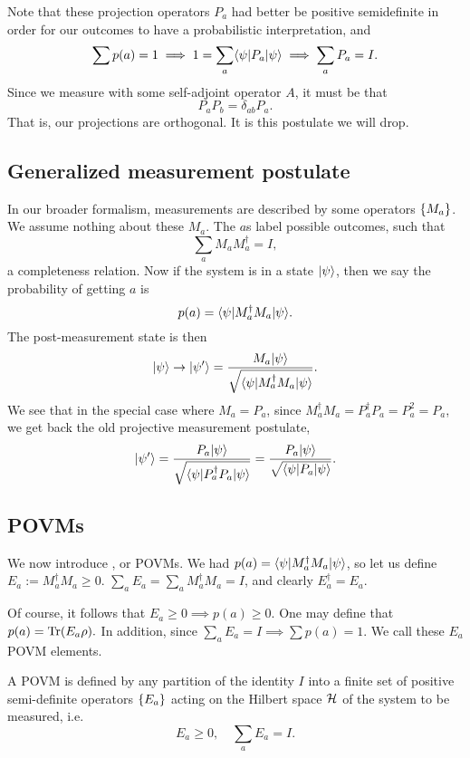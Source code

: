 Note that these projection operators $P_a$ had better be positive semidefinite in order for our outcomes to have a probabilistic interpretation, and 
\begin{equation}
    \sum p(a)=1 \implies 1 = \sum_a \langle\psi\rvert P_a \lvert\psi\rangle \implies \sum_a P_a = I.
\end{equation}
Since we measure with some self-adjoint operator $A$, it must be that
\begin{equation}
    P_a P_b = \delta_{ab} P_a.
\end{equation}
That is, our projections are orthogonal. It is this postulate we will drop.
\subsection*{Generalized measurement postulate}
In our broader formalism, measurements are described by some operators $\{M_a\}$. We assume nothing about these $M_a$. The $a$s label possible outcomes, such that
\begin{equation}
    \sum_a M_a M^\dagger_a = I,
\end{equation}
a completeness relation. Now if the system is in a state $\lvert\psi\rangle$, then we say the probability of getting $a$ is
\begin{equation}
    p(a) =\langle\psi\rvert M_a^\dagger M_a \lvert\psi\rangle.
\end{equation}
The post-measurement state is then
\begin{equation}
    \lvert\psi\rangle\to \lvert\psi'\rangle=\frac{M_a \lvert\psi\rangle}{\sqrt{\langle\psi\rvert M^\dagger_a M_a\lvert\psi\rangle}}.
\end{equation}
We see that in the special case where $M_a=P_a$, since $M_a^\dagger M_a = P_a^\dagger P_a = P_a^2 =P_a$, we get back the old projective measurement postulate,
\begin{equation*}
    \lvert\psi'\rangle=\frac{P_a \lvert\psi\rangle}{\sqrt{\langle\psi\rvert P^\dagger_a P_a\lvert\psi\rangle}}=\frac{P_a \lvert\psi\rangle}{\sqrt{\langle\psi\rvert P_a\lvert\psi\rangle}}.
\end{equation*}

\subsection*{POVMs}
We now introduce , or POVMs. We had $p(a)=\langle\psi\rvert M_a^\dagger M_a \lvert\psi\rangle$, so let us define $E_a := M_a ^\dagger M_a \geq 0$. $\sum_a E_a = \sum_a M_a^\dagger M_a =I$, and clearly $E_a^\dagger = E_a$.

Of course, it follows that $E_a \geq 0 \implies p(a) \geq 0$. One may define that $p(a)=\operatorname{Tr}(E_a \rho).$ In addition, since $\sum_a E_a=I\implies \sum p(a) =1$. We call these $E_a$ POVM elements.

\begin{defn}
    A POVM is defined by any partition of the identity $I$ into a finite set of positive semi-definite operators $\{E_a\}$ acting on the Hilbert space $\mathcal H$ of the system to be measured, i.e.
    \begin{equation*}
        E_a \geq 0, \quad \sum_a E_a = I.
    \end{equation*}
\end{defn}